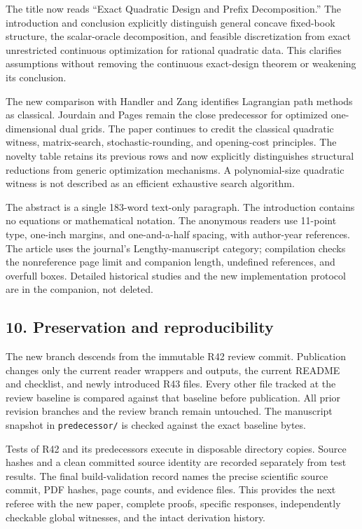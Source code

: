 \documentclass[11pt,letterpaper]{article}
\begin{document}
The title now reads “Exact Quadratic Design and Prefix Decomposition.” The introduction and conclusion explicitly distinguish general concave fixed-book structure, the scalar-oracle decomposition, and feasible discretization from exact unrestricted continuous optimization for rational quadratic data. This clarifies assumptions without removing the continuous exact-design theorem or weakening its conclusion.



The new comparison with Handler and Zang identifies Lagrangian path methods as classical. Jourdain and Pages remain the close predecessor for optimized one-dimensional dual grids. The paper continues to credit the classical quadratic witness, matrix-search, stochastic-rounding, and opening-cost principles. The novelty table retains its previous rows and now explicitly distinguishes structural reductions from generic optimization mechanisms. A polynomial-size quadratic witness is not described as an efficient exhaustive search algorithm.



The abstract is a single 183-word text-only paragraph. The introduction contains no equations or mathematical notation. The anonymous readers use 11-point type, one-inch margins, and one-and-a-half spacing, with author-year references. The article uses the journal's Lengthy-manuscript category; compilation checks the nonreference page limit and companion length, undefined references, and overfull boxes. Detailed historical studies and the new implementation protocol are in the companion, not deleted.



\subsection*{10. Preservation and reproducibility}


The new branch descends from the immutable R42 review commit. Publication changes only the current reader wrappers and outputs, the current README and checklist, and newly introduced R43 files. Every other file tracked at the review baseline is compared against that baseline before publication. All prior revision branches and the review branch remain untouched. The manuscript snapshot in \nolinkurl{predecessor/} is checked against the exact baseline bytes.



Tests of R42 and its predecessors execute in disposable directory copies. Source hashes and a clean committed source identity are recorded separately from test results. The final build-validation record names the precise scientific source commit, PDF hashes, page counts, and evidence files. This provides the next referee with the new paper, complete proofs, specific responses, independently checkable global witnesses, and the intact derivation history.
\end{document}
